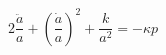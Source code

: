 \begin{equation}\label{einstein2}
 2\frac{\ddot{a}}{a}+(\frac{\dot{a}}{a})^2+\frac{k}{a^2}=-\kappa p
\end{equation}

